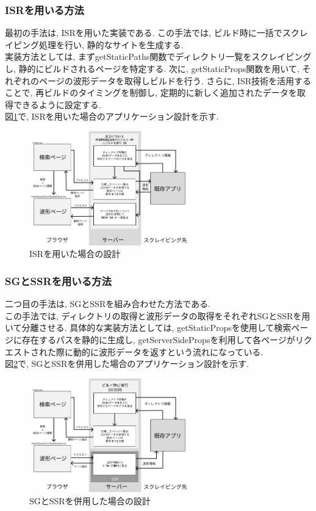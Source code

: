 \subsubsection{ISRを用いる方法}
最初の手法は, ISRを用いた実装である. この手法では, ビルド時に一括でスクレイピング処理を行い, 静的なサイトを生成する. \\
実装方法としては, まずgetStaticPaths関数でディレクトリ一覧をスクレイピングし, 静的にビルドされるページを特定する. 
次に, getStaticProps関数を用いて, それぞれのページの波形データを取得しビルドを行う. 
さらに, ISR技術を活用することで, 再ビルドのタイミングを制御し, 定期的に新しく追加されたデータを取得できるように設定する. \\
図\ref{fig:ISR-arc}で, ISRを用いた場合のアプリケーション設計を示す. 

\begin{figure}[htbp]
	\begin{center}
		\includegraphics[width=70mm]{./images/app/ISRver.png}
		\caption{ISRを用いた場合の設計}\label{fig:ISR-arc}
	\end{center}
\end{figure}

\subsubsection{SGとSSRを用いる方法}
二つ目の手法は, SGとSSRを組み合わせた方法である. \\
この手法では, ディレクトリの取得と波形データの取得をそれぞれSGとSSRを用いて分離させる. 
具体的な実装方法としては, getStaticPropsを使用して検索ページに存在するパスを静的に生成し, getServerSidePropsを利用して各ページがリクエストされた際に動的に波形データを返すという流れになっている. \\
図\ref{fig:SG-SSR-arc}で, SGとSSRを併用した場合のアプリケーション設計を示す. 

\begin{figure}[htbp]
	\begin{center}
		\includegraphics[width=70mm]{./images/app/SG-SSRver.png}
		\caption{SGとSSRを併用した場合の設計}\label{fig:SG-SSR-arc}
	\end{center}
\end{figure}

